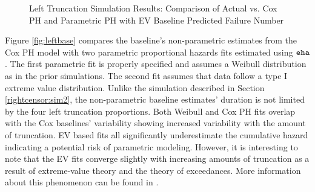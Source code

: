 \begin{figure}[h!]
	\centering
	\quad
	\quad
	\quad
	\caption{Left Truncation Simulation Results: Comparison of Actual vs. Cox PH and Parametric PH with EV Baseline Predicted Failure Number}
	\label{fig:lefttruncation}
\end{figure}
Figure \ref{fig:leftbase} compares the baseline's non-parametric estimates from the Cox PH model with two parametric proportional hazards fits estimated using $\tt eha$ \citep{eha}.  The first parametric fit is properly specified and assumes a  Weibull distribution as in the prior simulations. The second fit assumes that data follow a type I extreme value distribution.
Unlike the simulation described in Section \ref{rightcensor:sim2}, the non-parametric baseline estimates' duration is not limited by the four left truncation proportions. Both Weibull and Cox PH fits overlap with the Cox baselines' variability showing increased variability with the amount of truncation. EV based fits all significantly underestimate the cumulative hazard indicating a potential risk of parametric modeling. However, it is interesting to note that the EV fits converge slightly with increasing amounts of truncation as a result of extreme-value theory and the theory of exceedances. More information about this phenomenon can be found in \citet{coles2001}.

